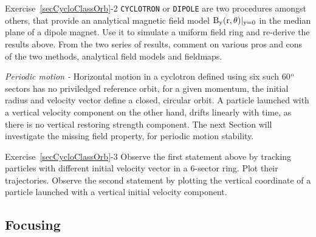 \smallskip
\noindent {\small $\bullet$} Exercise~\ref{secCycloClassOrb}-2 
 \verb|CYCLOTRON| or \verb|DIPOLE| are two procedures amongst others, that provide an analytical 
 magnetic field model $\rm {B_y(r,\theta)|_{y=0}}$ in the median plane of a dipole magnet. 
Use it to simulate a uniform field ring and re-derive the results above. 
From the two series of results, comment on various pros and cons of the two methods, analytical field models and 
fieldmaps.

\medskip

\noindent \textsl{Periodic motion -} 
Horizontal motion in a  cyclotron defined using six such 60$\rm ^o$ sectors has no priviledged reference orbit, 
for a given momentum, the initial radius and velocity vector define a closed, circular orbit.  
A particle launched with a vertical velocity component on the other hand, drifts linearly with time, as there is no 
vertical restoring strength component. The next Section will investigate the missing field property, 
for  periodic motion stability. 


\smallskip
\noindent {\small $\bullet$} Exercise~\ref{secCycloClassOrb}-3 
Observe the first statement above by tracking  particles with different initial velocity vector in a 6-sector ring. 
Plot their trajectories. 
Observe the second statement by plotting the vertical coordinate  of a particle launched with a 
vertical initial velocity component. 



\subsection{Focusing  \label{secCycloFocus}}

